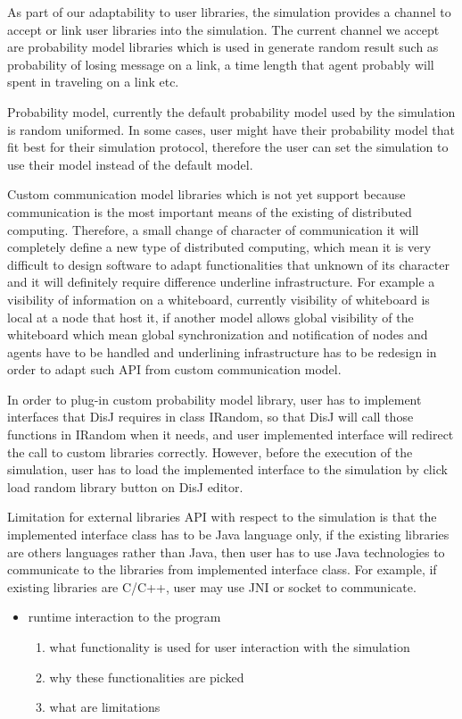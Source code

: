 As part of our adaptability to user libraries, the simulation provides a channel to accept or link user libraries into the simulation. The current channel we accept are probability model libraries which is used in generate random result such as probability of losing message on a link, a time length that agent probably will spent in traveling on a link etc.

Probability model, currently the default probability model used by the simulation is random uniformed. In some cases, user might have their probability model that fit best for their simulation protocol, therefore the user can set the simulation to use their model instead of the default model.

Custom communication model libraries which is not yet support because communication is the most important means of the existing of distributed computing. Therefore, a small change of character of communication it will completely define a new type of distributed computing, which mean it is very difficult to design software to adapt functionalities that unknown of its character and it will definitely require difference underline infrastructure. For example a visibility of information on a whiteboard, currently visibility of whiteboard is local at a node that host it, if another model allows global visibility of the whiteboard which mean global synchronization and notification of nodes and agents have to be handled and underlining infrastructure has to be redesign in order to adapt such API from custom communication model.

In order to plug-in custom probability model library, user has to implement interfaces that DisJ requires in class IRandom, so that DisJ will call those functions in IRandom when it needs, and user implemented interface will redirect the call to custom libraries correctly. However, before the execution of the simulation, user has to load the implemented interface to the simulation by click load random library button on DisJ editor.

Limitation for external libraries API with respect to the simulation is that the implemented interface class has to be Java language only, if the existing libraries are others languages rather than Java, then user has to use Java technologies to communicate to the libraries from implemented interface class. For example, if existing libraries are C/C++, user may use JNI or socket to communicate.


\begin{itemize}
\item  runtime interaction to the program
    \begin{enumerate}
    \item  what functionality is used for user interaction with the simulation
    \item  why these functionalities are picked
    \item  what are limitations
    \end{enumerate}
\end{itemize}

